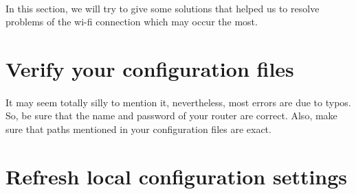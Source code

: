 \documentclass[12pt]{report}
\begin{document}
	\paragraph{}
	In this section, we will try to give some solutions that helped us to resolve problems of the wi-fi connection which may occur the most. 
	\section{Verify your configuration files}
	\paragraph{}
	It may seem totally silly to mention it, nevertheless, most errors are due to typos. So, be sure that the name and password of your router are correct. Also, make sure that paths mentioned in your configuration files are exact.
	\section{Refresh local configuration settings}
\end{document}
